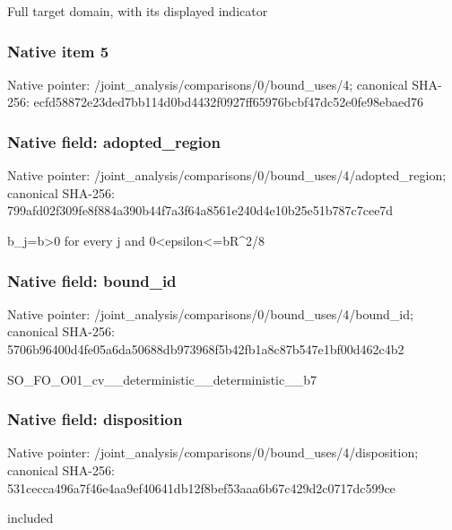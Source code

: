 \documentclass[10pt,a4paper]{article}
\begin{document}
\begingroup\raggedright\sloppy Full target domain,\allowbreak{} with its displayed indicator\par\endgroup

\subsubsection{Native item 5}
Native pointer: /joint\_\allowbreak{}analysis/comparisons/0/bound\_\allowbreak{}uses/4; canonical SHA-256: ecfd58872e23ded7bb114d0bd4432f0927ff65976bcbf47dc52e0fe98ebaed76

\subsubsection{Native field: adopted\_\allowbreak{}region}
Native pointer: /joint\_\allowbreak{}analysis/comparisons/0/bound\_\allowbreak{}uses/4/adopted\_\allowbreak{}region; canonical SHA-256: 799afd02f309fe8f884a390b44f7a3f64a8561e240d4e10b25e51b787c7cee7d

\begingroup\raggedright\sloppy b\_\allowbreak{}j=\allowbreak{}b>0 for every j and 0<epsilon<=\allowbreak{}bR\textasciicircum{}2/\allowbreak{}8\par\endgroup

\subsubsection{Native field: bound\_\allowbreak{}id}
Native pointer: /joint\_\allowbreak{}analysis/comparisons/0/bound\_\allowbreak{}uses/4/bound\_\allowbreak{}id; canonical SHA-256: 5706b96400d4fe05a6da50688db973968f5b42fb1a8c87b547e1bf00d462c4b2

\begingroup\raggedright\sloppy SO\_\allowbreak{}FO\_\allowbreak{}O01\_\allowbreak{}cv\_\allowbreak{}\_\allowbreak{}deterministic\_\allowbreak{}\_\allowbreak{}deterministic\_\allowbreak{}\_\allowbreak{}b7\par\endgroup

\subsubsection{Native field: disposition}
Native pointer: /joint\_\allowbreak{}analysis/comparisons/0/bound\_\allowbreak{}uses/4/disposition; canonical SHA-256: 531cecca496a7f46e4aa9ef40641db12f8bef53aaa6b67c429d2c0717dc599ce

\begingroup\raggedright\sloppy included\par\endgroup
\end{document}
